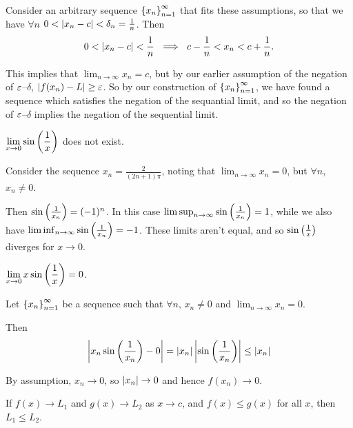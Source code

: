 \documentclass[12pt]{article}
\theoremstyle{definition}
\renewenvironment{proof}[1][\proofname]{\vspace{-10pt}\begin{replacementproof}}{\end{replacementproof}}
\newcommand{\xn}{\set{x_{n}}_{n = 1}^{\infty}}
\newcommand{\nlim}{\lim_{n\rightarrow\infty}}
\newcommand{\ds}{\displaystyle}
\begin{document}
\begin{proof}
                Consider an arbitrary sequence $\xn$ that fits these assumptions, so that we have $\forall n$ $0 < \left|x_{n} - c\right| < \delta_{n} = \frac{1}{n}$. Then
                \begin{equation*}
                    0 < \left|x_{n} - c\right| < \frac{1}{n} ~ \implies ~ c - \frac{1}{n} < x_{n} < c + \frac{1}{n}.
                \end{equation*}

                This implies that $\lim_{n \rightarrow \infty}x_{n} = c$, but by our earlier assumption of the negation of $\varepsilon$--$\delta$, $\left|f(x_{n}) - L\right| \geq \varepsilon$. So by our construction of $\xn$, we have found a sequence which satisfies the negation of the sequantial limit, and so the negation of $\varepsilon$--$\delta$ implies the negation of the sequential limit.
            \end{proof}
            \begin{eg}
                $\ds\lim_{x \rightarrow 0}\sin\brackets{\frac{1}{x}}$ does not exist.

                Consider the sequence $x_{n} = \frac{2}{(2n + 1)\pi}$, noting that $\nlim x_{n} = 0$, but $\forall n$, $x_{n} \neq 0$. 
                
                Then $\sin\left(\frac{1}{x_{n}}\right) = (-1)^{n}$. In this case $\limsup_{n \rightarrow \infty}\sin\left(\frac{1}{x_{n}}\right) = 1$, while we also have $\liminf_{n \rightarrow \infty}\sin\left(\frac{1}{x_{n}}\right) = -1$. These limits aren't equal, and so $\sin\left(\frac{1}{x}\right)$ diverges for $x \rightarrow 0$.
            \end{eg}
            \begin{eg}
                $\ds\lim_{x \rightarrow 0}x\sin\brackets{\frac{1}{x}} = 0$.

                Let $\xn$ be a sequence such that $\forall n$, $x_{n} \neq 0$ and $\nlim x_{n} = 0$.

                Then
                \begin{equation*}
                    \left|x_{n}\sin\left(\frac{1}{x_{n}}\right) - 0\right| = \left|x_{n}\right|\left|\sin\left(\frac{1}{x_{n}}\right)\right| \leq \left|x_{n}\right|
                \end{equation*}

                By assumption, $x_{n} \rightarrow 0$, so $\left|x_{n}\right| \rightarrow 0$ and hence $f(x_{n}) \rightarrow 0$.
            \end{eg}
            \begin{corollary}
                If $f(x) \rightarrow L_{1}$ and $g(x) \rightarrow L_{2}$ as $x \rightarrow c$, and $f(x) \leq g(x)$ for all $x$, then $L_{1} \leq L_{2}$.
            \end{corollary}
\end{document}
